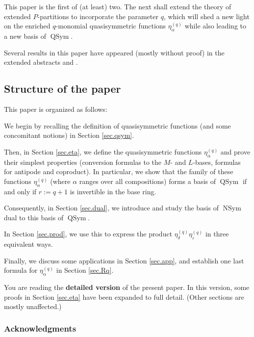 \documentclass[numbers=enddot,12pt,final,onecolumn,notitlepage]{scrartcl}%
\theoremstyle{definition}
\newenvironment{verlong}{}{}
\begin{document}
This paper is the first of (at least) two. The next shall extend the theory of
extended $P$-partitions to incorporate the parameter $q$, which will shed a
new light on the enriched $q$-monomial quasisymmetric functions $\eta_{\alpha
}^{\left(  q\right)  }$ while also leading to a new basis of
$\operatorname*{QSym}$.

Several results in this paper have appeared (mostly without proof) in the
extended abstracts \cite{GriVas21} and \cite{GriVas22}.

\subsection{Structure of the paper}

This paper is organized as follows:

We begin by recalling the definition of quasisymmetric functions (and some
concomitant notions) in Section \ref{sec.qsym}.

Then, in Section \ref{sec.eta}, we define the quasisymmetric functions
$\eta_{\alpha}^{\left(  q\right)  }$ and prove their simplest properties
(conversion formulas to the $M$- and $L$-bases, formulas for antipode and
coproduct). In particular, we show that the family of these functions
$\eta_{\alpha}^{\left(  q\right)  }$ (where $\alpha$ ranges over all
compositions) forms a basis of $\operatorname*{QSym}$ if and only if $r:=q+1$
is invertible in the base ring.

Consequently, in Section \ref{sec.dual}, we introduce and study the basis of
$\operatorname*{NSym}$ dual to this basis of $\operatorname*{QSym}$.

In Section \ref{sec.prod}, we use this to express the product $\eta_{\delta
}^{\left(  q\right)  }\eta_{\varepsilon}^{\left(  q\right)  }$ in three
equivalent ways.

Finally, we discuss some applications in Section \ref{sec.app}, and establish
one last formula for $\eta_{\alpha}^{\left(  q\right)  }$ in Section
\ref{sec.Rq}.

\begin{verlong}
You are reading the \textbf{detailed version} of the present paper. In this
version, some proofs in Section \ref{sec.eta} have been expanded to full
detail. (Other sections are mostly unaffected.)
\end{verlong}

\subsubsection*{Acknowledgments}
\end{document}
